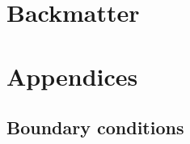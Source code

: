 \documentclass[11pt]{article}
\begin{document}
\section{Backmatter}
\label{sec:org8cfe36a}




\appendix

\section{Appendices}
\label{sec:org7175f83}

\subsection{Boundary conditions}
\label{sec:orga10c0cf}
\end{document}
